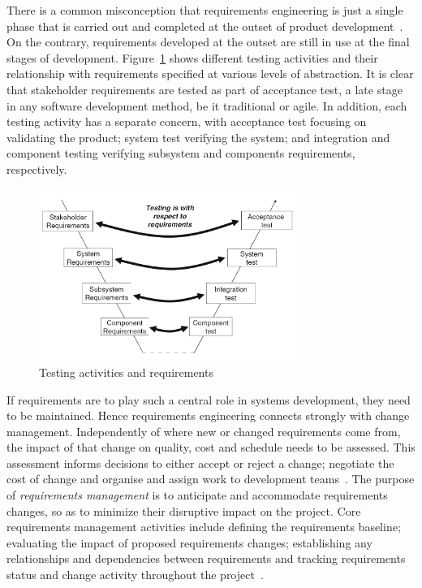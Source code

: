 \documentclass[dissertation,final]{softeng}
\begin{document}
There is a common misconception that requirements engineering is just a single phase that is carried out and completed at the outset of product development~\citep{Hull2011}. On the contrary, requirements developed at the outset are still in use at the final stages of development. Figure~\ref{fig:testsandreqs} shows different testing activities and their relationship with requirements specified at various levels of abstraction. It is clear that stakeholder requirements are tested as part of acceptance test, a late stage in any software development method, be it traditional or agile. In addition, each testing activity has a separate concern, with acceptance test focusing on validating the product; system test verifying the system; and integration and component testing verifying subsystem and components requirements, respectively.
\begin{figure}[h]
\includegraphics[width=0.75\textwidth]{RoleOfRequirementsInRelationToTesting}
\centering
\caption[Testing activities and requirements]{Testing activities and requirements~\citep{Hull2011}}
\label{fig:testsandreqs}
\end{figure}

If requirements are to play such a central role in systems development, they need to be maintained. Hence requirements engineering connects strongly with change management. Independently of where new or changed requirements come from, the impact of that change on quality, cost and schedule needs to be assessed. This assessment informs decisions to either accept or reject a change; negotiate the cost of change and organise and assign work to development teams~\citep{Hull2011}. The purpose of \emph{requirements management} is to anticipate and accommodate requirements changes, so as to minimize their disruptive impact on the project. Core requirements management activities include defining the requirements baseline; evaluating the impact of proposed requirements changes; establishing any relationships and dependencies between requirements and tracking requirements status and change activity throughout the project~\citep{Wiegers2013}.
\end{document}
